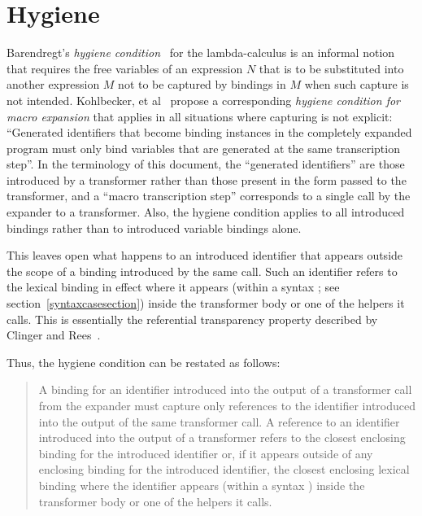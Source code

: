 \section{Hygiene}
\label{hygienesection}


Barendregt's \emph{hygiene condition}~\cite{barendregt} for the
lambda-calculus is an informal notion that requires the free variables of
an expression $N$ that is to be substituted into another expression $M$ not to
be captured by bindings in $M$ when such capture is not intended.
Kohlbecker, et al~\cite{hygienic} propose a corresponding
\emph{hygiene condition for macro expansion} that applies in all situations
where capturing is not explicit:
``Generated identifiers that become binding instances in
the completely expanded program must only bind variables that
are generated at the same transcription step''.
In the terminology of this document, the ``generated identifiers'' are
those introduced by a transformer rather than those present in the form
passed to the transformer, and a ``macro transcription step'' corresponds
to a single call by the expander to a transformer.
Also, the hygiene condition applies to all introduced bindings rather than
to introduced variable bindings alone.

This leaves open what happens to an introduced identifier that appears
outside the scope of a binding introduced by the same call.
Such an identifier refers to the lexical binding in effect where it
appears (within a {\cf syntax} ;
see section~\ref{syntaxcasesection}) inside the transformer body or one of
the helpers it calls.
This is essentially the referential transparency property described
by Clinger and Rees~\cite{macrosthatwork}.

Thus, the hygiene condition can be restated as follows:

\begin{quotation}
\noindent
A binding for an identifier introduced into the output of a transformer
call from the expander must capture only references to the identifier
introduced into the output of the same transformer call.
A reference to an identifier introduced into the output of a transformer
refers to the closest enclosing binding for the introduced identifier or,
if it appears outside of any enclosing binding for the introduced
identifier, the closest enclosing lexical binding where the identifier
appears (within a {\cf syntax} )
inside the transformer body or one of the helpers it calls.
\end{quotation}

